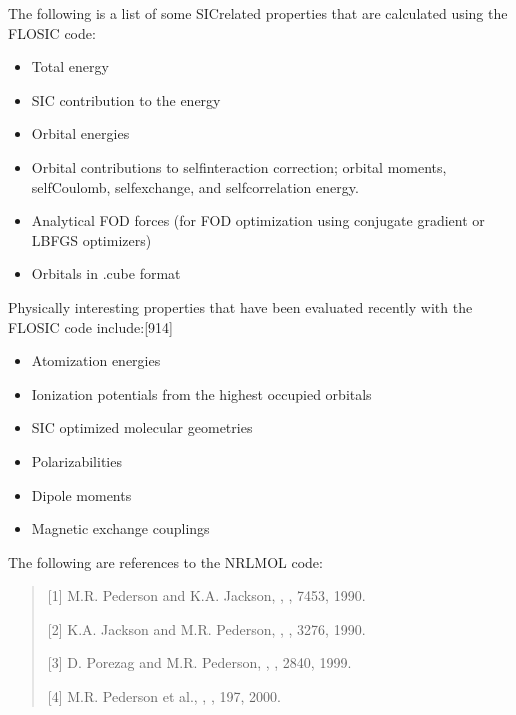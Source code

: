 \documentclass[letterpaper,10pt,english,openany,oneside]{sphinxmanual}
\begin{document}
\sphinxAtStartPar
The following is a list of some SIC\sphinxhyphen{}related properties that are calculated using the FLOSIC code:
\begin{itemize}
\item {} 
\sphinxAtStartPar
Total energy

\item {} 
\sphinxAtStartPar
SIC contribution to the energy

\item {} 
\sphinxAtStartPar
Orbital energies

\item {} 
\sphinxAtStartPar
Orbital contributions to self\sphinxhyphen{}interaction correction; orbital moments, self\sphinxhyphen{}Coulomb, self\sphinxhyphen{}exchange, and self\sphinxhyphen{}correlation energy.

\item {} 
\sphinxAtStartPar
Analytical FOD forces (for FOD optimization using conjugate gradient or LBFGS optimizers)

\item {} 
\sphinxAtStartPar
Orbitals in .cube format

\end{itemize}

\sphinxAtStartPar
Physically interesting properties that have been evaluated recently with the FLOSIC code include:{[}9\sphinxhyphen{}14{]}
\begin{itemize}
\item {} 
\sphinxAtStartPar
Atomization energies

\item {} 
\sphinxAtStartPar
Ionization potentials from the highest occupied orbitals

\item {} 
\sphinxAtStartPar
SIC optimized molecular geometries

\item {} 
\sphinxAtStartPar
Polarizabilities

\item {} 
\sphinxAtStartPar
Dipole moments

\item {} 
\sphinxAtStartPar
Magnetic exchange couplings

\end{itemize}

\sphinxAtStartPar
The following are references to the NRLMOL code:
\begin{quote}

\sphinxAtStartPar
{[}1{]} M.R. Pederson and K.A. Jackson, , , 7453, 1990.

\sphinxAtStartPar
{[}2{]} K.A. Jackson and M.R. Pederson, , , 3276, 1990.

\sphinxAtStartPar
{[}3{]} D. Porezag and M.R. Pederson, , , 2840, 1999.

\sphinxAtStartPar
{[}4{]} M.R. Pederson et al., , , 197, 2000.
\end{quote}
\end{document}
